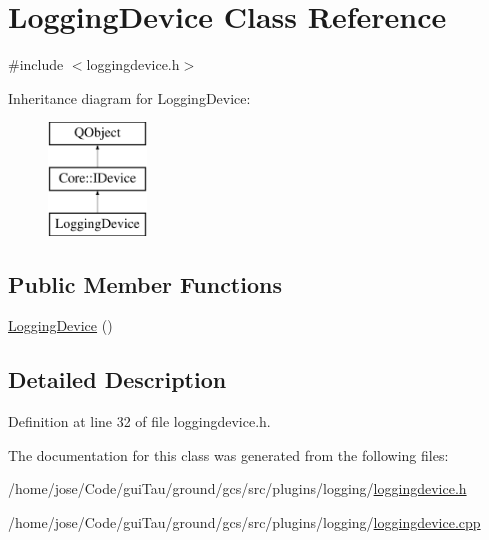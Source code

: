 \hypertarget{class_logging_device}{\section{Logging\-Device Class Reference}
\label{class_logging_device}
}


{\ttfamily \#include $<$loggingdevice.\-h$>$}

Inheritance diagram for Logging\-Device\-:\begin{figure}[H]
\begin{center}
\leavevmode
\includegraphics[height=3.000000cm]{class_logging_device}
\end{center}
\end{figure}
\subsection*{Public Member Functions}
\begin{DoxyCompactItemize}
\item 
\hyperlink{group___core_plugin_gaba24d30b517c7a1f35721b04eb1cc90b}{Logging\-Device} ()
\end{DoxyCompactItemize}


\subsection{Detailed Description}


Definition at line 32 of file loggingdevice.\-h.



The documentation for this class was generated from the following files\-:\begin{DoxyCompactItemize}
\item 
/home/jose/\-Code/gui\-Tau/ground/gcs/src/plugins/logging/\hyperlink{loggingdevice_8h}{loggingdevice.\-h}\item 
/home/jose/\-Code/gui\-Tau/ground/gcs/src/plugins/logging/\hyperlink{loggingdevice_8cpp}{loggingdevice.\-cpp}\end{DoxyCompactItemize}
